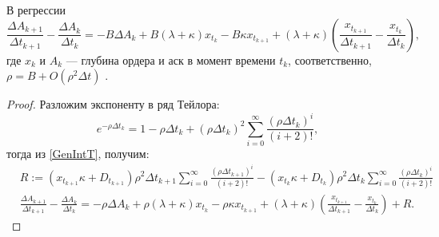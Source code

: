 \begin{appendices}
        \begin{theorem}\label{lilreg}
                В регрессии                                                                                                                                                                                                                                                                                                                                                                                       
                \begin{equation*}
                        \frac{\Delta A_{k+1}}{\Delta t_{k+1}} - \frac{\Delta A_{k}}{\Delta t_{k}}
                        = -B \Delta A_k + B (\lambda + \kappa) x_{t_k} - B \kappa x_{t_{k+1}} + 
                        (\lambda + \kappa) \left(\frac{x_{t_{k+1}}}{\Delta t_{k+1}} - \frac{x_{t_k}}{\Delta t_{k}}\right),
                \end{equation*}
                где $x_{k}$ и $A_{k}$ --- глубина ордера и аск в момент времени $t_k$, соответственно, \\
                $\rho = B + O(\rho^2 \Delta t)$ .
        \end{theorem}
        \begin{proof}
        Разложим экспоненту в ряд Тейлора: 
        \begin{equation*}
                e^{- \rho \Delta t_k} = 1 - \rho \Delta t_k + (\rho \Delta t_k) ^2 \sum_{i=0}^{\infty} \frac{(\rho \Delta t_k)^i}{(i+2)!},
        \end{equation*}
        тогда из \ref{GenIntT}, получим:
        \begin{align*}
                & R := (x_{t_{k+1}} \kappa + D_{t_{k+1}}) \rho^2 \Delta t_{k+1}  \sum_{i=0}^{\infty} \frac{(\rho \Delta t_{k+1})^i}{(i+2)!} 
                - (x_{t_k} \kappa + D_{t_k}) \rho^2 \Delta t_k \sum_{i=0}^{\infty} \frac{(\rho \Delta t_k)^i}{(i+2)!} \\
                & \frac{\Delta A_{k+1}}{\Delta t_{k+1}} - \frac{\Delta A_{k}}{\Delta t_{k}} = -\rho \Delta A_k + \rho (\lambda + \kappa) x_{t_k} - \rho \kappa x_{t_{k+1}} 
                + (\lambda + \kappa) \left(\frac{x_{t_{k+1}}}{\Delta t_{k+1}} - \frac{x_{t_k}}{\Delta t_{k}}\right) + R.
        \end{align*} 
        \end{proof}


\end{appendices}
